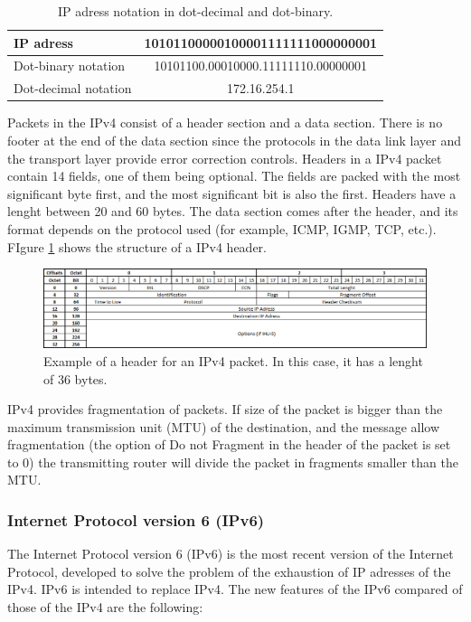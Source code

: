 \begin{table}[H]
\begin{center}
\begin{tabular}{|l|c|}
\hline 
IP adress & 10101100000100001111111000000001 \\ 
\hline 
Dot-binary notation & 10101100.00010000.11111110.00000001 \\ 
\hline 
Dot-decimal notation & 172.16.254.1 \\ 
\hline
\end{tabular}
\end{center}
\caption[IP adress notation]{IP adress notation in dot-decimal and dot-binary.}
\label{table:IPadress}
\end{table}

Packets in the IPv4 consist of a header section and a data section. There is no footer at the end of the data section since the protocols in the data link layer and the transport layer provide error correction controls. Headers in a IPv4 packet contain 14 fields, one of them being optional. The fields are packed with the most significant byte first, and the most significant bit is also the first. Headers have a lenght between 20 and 60 bytes. The data section comes after the header, and its format depends on the protocol used (for example, ICMP, IGMP, TCP, etc.). FIgure \ref{fig:IPv4header} shows the structure of a IPv4 header.

\begin{figure}[H]
\begin{center}
\includegraphics[scale=0.6]{IPv4_header.PNG}
\caption[IPv4 header]{Example of a header for an IPv4 packet. In this case, it has a lenght of 36 bytes.}
\label{fig:IPv4header}
\end{center}
\end{figure}

IPv4 provides fragmentation of packets. If size of the packet is bigger than the maximum transmission unit (MTU) of the destination, and the message allow fragmentation (the option of Do not Fragment in the header of the packet is set to 0) the transmitting router will divide the packet in fragments smaller than the MTU.

\subsubsection*{Internet Protocol version 6 (IPv6)\cite{IPv6}}
The Internet Protocol version 6 (IPv6) is the most recent version of the Internet Protocol, developed to solve the problem of the exhaustion of IP adresses of the IPv4. IPv6 is intended to replace IPv4. The new features of the IPv6 compared of those of the IPv4 are the following:

